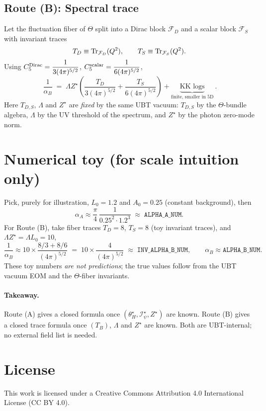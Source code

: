 \documentclass[12pt]{article}
\begin{document}
\subsection*{Route (B): Spectral trace}
Let the fluctuation fiber of $\Theta$ split into a Dirac block $\mathcal F_D$ and a scalar block $\mathcal F_S$ with invariant traces
\begin{equation}
T_D\equiv \Tr_{\mathcal F_D}(Q^2),\qquad T_S\equiv \Tr_{\mathcal F_S}(Q^2).
\end{equation}
Using $C_5^{\rm Dirac}=\dfrac{1}{3(4\pi)^{5/2}}$, $C_5^{\rm scalar}=\dfrac{1}{6(4\pi)^{5/2}}$,
\begin{equation}
\boxed{~ \frac{1}{\alpha_B} \;=\; \Lambda Z^\star \left( \frac{T_D}{3(4\pi)^{5/2}} + \frac{T_S}{6(4\pi)^{5/2}} \right) + \underbrace{\text{KK logs}}_{\text{finite, smaller in 5D}} ~}.
\end{equation}
Here $T_{D,S}$, $\Lambda$ and $Z^\star$ are \emph{fixed} by the same UBT vacuum: $T_{D,S}$ by the $\Theta$-bundle algebra,
$\Lambda$ by the UV threshold of the spectrum, and $Z^\star$ by the photon zero-mode norm.

\section*{Numerical toy (for scale intuition only)}
Pick, purely for illustration, $L_0=1.2$ and $A_0=0.25$ (constant background), then
\begin{equation}
\alpha_A \approx \frac{\pi}{4}\,\frac{1}{0.25^2 \cdot 1.2^3} \;\approx\; \texttt{ALPHA\_A\_NUM}.
\end{equation}
For Route (B), take fiber traces $T_D=8$, $T_S=8$ (toy invariant traces), and $\Lambda Z^\star = \Lambda L_0 = 10$,
\begin{equation}
\frac{1}{\alpha_B} \approx 10 \times \frac{8/3 + 8/6}{(4\pi)^{5/2}} \;=\; 10 \times \frac{4}{(4\pi)^{5/2}} \;\approx\; \texttt{INV\_ALPHA\_B\_NUM},
\qquad \alpha_B \approx \texttt{ALPHA\_B\_NUM}.
\end{equation}
These toy numbers \emph{are not predictions}; the true values follow from the UBT vacuum EOM and the $\Theta$-fiber invariants.

\paragraph{Takeaway.} Route (A) gives a closed formula once $(\theta_H^\star,\mathcal I_\psi^\star,Z^\star)$ are known. Route (B) gives a closed
trace formula once $(T_B)$, $\Lambda$ and $Z^\star$ are known. Both are UBT-internal; no external field list is needed.


\section*{License}
This work is licensed under a Creative Commons Attribution 4.0 International License (CC BY 4.0).
\end{document}
